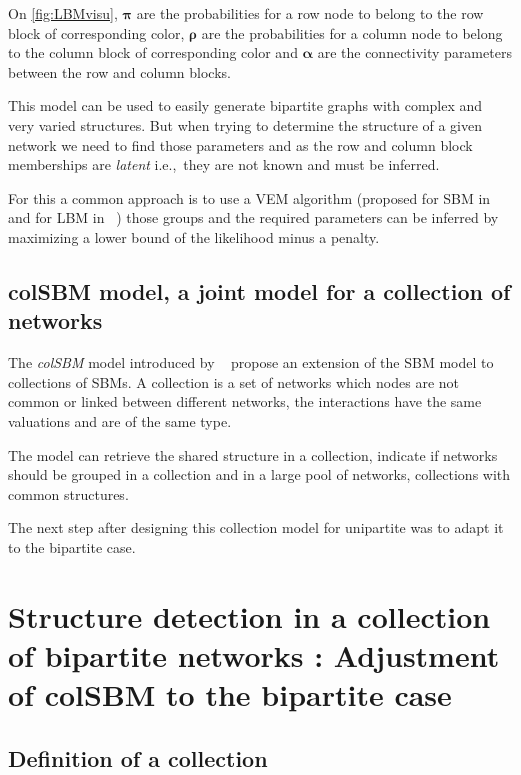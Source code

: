 \documentclass[12pt,a4paper]{report}
\begin{document}
On \ref{fig:LBMvisu}, $\bm{\pi}$ are the probabilities for a row node to belong to
the row block of corresponding color, $\bm{\rho}$ are the probabilities for a column
node to belong to the column block of corresponding color and $\bm{\alpha}$ are the
connectivity parameters between the row and column blocks.

This model can be used to easily generate bipartite graphs with complex and very
varied structures. But when trying to determine the structure of a given network
we need to find those parameters and as the row and column block memberships are
\emph{latent} i.e.,\ they are not known and must be inferred.

For this a common approach is to use a VEM algorithm
(proposed for SBM in ~\cite{daudinMixtureModelRandom2008} and for LBM in ~\cite{govaertEMAlgorithmBlock2005})
those groups and the required parameters can be inferred by maximizing a lower
bound of the likelihood minus a penalty.

\section{colSBM model, a joint model for a collection of networks}
\label{sec:colsbm-model-a-joint-model-for-a-collection-of-networks}
The \emph{colSBM} model introduced by ~\cite{chabert-liddellLearningCommonStructures2023}
propose an extension of the SBM model to collections of SBMs. A collection is a
set of networks which nodes are not common or linked between different networks,
the interactions have the same valuations and are of the same type.

The model can retrieve the shared structure in a collection, indicate
if networks should be grouped in a collection and  in a large pool of networks,
collections with common structures.

The next step after designing this collection model for unipartite was to adapt
it to the bipartite case.

\chapter{Structure detection in a collection of bipartite networks : Adjustment of colSBM to the bipartite case}
\section{Definition of a collection}\label{sec:definition-of-a-collection}
\end{document}
